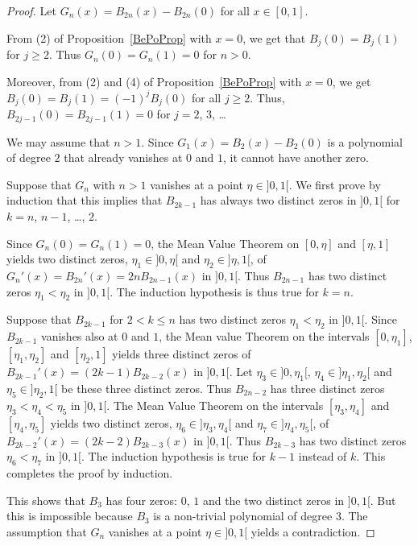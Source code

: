 \begin{proof}
Let $G_n(x) = B_{2n}(x) - B_{2n}(0)$ for all $x\in [0,1]$.

From (2) of Proposition~\ref{BePoProp} with $x=0$, we get that
$B_j(0) = B_j(1)$ for $j\geq 2$.  Thus $G_n(0)= G_n(1)= 0$ for $n>0$.

Moreover, from (2) and (4) of Proposition~\ref{BePoProp} with $x=0$, we get
$\displaystyle B_j(0) = B_j(1) = (-1)^j B_j(0)$ for all $j\geq 2$.
Thus, $B_{2j-1}(0) = B_{2j-1}(1) = 0$ for $j=2$, $3$, \ldots

We may assume that $n>1$.  Since $G_1(x) = B_2(x) - B_2(0)$ is a
polynomial of degree $2$ that already vanishes at $0$ and $1$,  it
cannot have another zero.

Suppose that $G_n$ with $n>1$ vanishes at a point $\eta \in ]0,1[$.
We first prove by induction that this implies that $B_{2k-1}$ has
always two distinct zeros in $]0,1[$ for $k=n$, $n-1$, \ldots, $2$.

Since $G_n(0) = G_n(1) = 0$, the Mean Value Theorem on $[0,\eta]$ and
$[\eta,1]$ yields two distinct zeros, $\eta_1 \in ]0,\eta[$ and
$\eta_2 \in ]\eta,1[$, of
$\displaystyle G_n'(x) = B_{2n}'(x) = 2nB_{2n-1}(x)$ in $]0,1[$.
Thus $B_{2n-1}$ has two distinct zeros $\eta_1 < \eta_2$ in
$]0,1[$.  The induction hypothesis is thus true for $k=n$.

Suppose that $B_{2k-1}$ for $2 < k \leq n$ has two distinct
zeros $\eta_1 < \eta_2$ in $]0,1[$.  Since $B_{2k-1}$ vanishes also at
$0$ and $1$, the Mean value Theorem on the intervals $[0,\eta_1]$,
$[\eta_1,\eta_2]$ and $[\eta_2,1]$ yields three distinct zeros of
$\displaystyle B_{2k-1}'(x) = (2k-1)B_{2k-2}(x)$ in $]0,1[$.
Let $\eta_3 \in ]0,\eta_1[$, $\eta_4\in ]\eta_1,\eta_2[$ and
$\eta_5 \in ]\eta_2,1[$ be these three distinct zeros.
Thus $B_{2n-2}$ has three distinct zeros $\eta_3 < \eta_4 < \eta_5$ in
$]0,1[$.  The Mean Value Theorem on the intervals $[\eta_3,\eta_4]$ and
$[\eta_4,\eta_5]$ yields two distinct zeros,
$\eta_6 \in ]\eta_3,\eta_4[$ and $\eta_7\in ]\eta_4,\eta_5[$, of
$\displaystyle B_{2k-2}'(x) = (2k-2)B_{2k-3}(x)$ in $]0,1[$.
Thus $B_{2k-3}$ has two distinct zeros $\eta_6 < \eta_7$ in $]0,1[$.
The induction hypothesis  is true for $k-1$ instead of $k$.  This
completes the proof by induction.

This shows that $B_3$ has four zeros: $0$, $1$ and the two distinct
zeros in $]0,1[$.  But this is impossible because $B_3$ is a
non-trivial polynomial of degree $3$.  The assumption that $G_n$
vanishes at a point $\eta \in ]0,1[$ yields a contradiction.
\end{proof}

